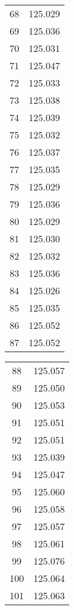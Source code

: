 \begin{multicols}{3}
\begin{table}[H]
\begin{tabular}{|c|c|}
            68 & 125.029 \\
            69 & 125.036 \\
            70 & 125.031 \\
            71 & 125.047 \\
            72 & 125.033 \\
            73 & 125.038 \\
            74 & 125.039 \\
            75 & 125.032 \\
            76 & 125.037 \\
            77 & 125.035 \\
            78 & 125.029 \\
            79 & 125.036 \\
            80 & 125.029 \\
            81 & 125.030 \\
            82 & 125.032 \\
            83 & 125.036 \\
            84 & 125.026 \\
            85 & 125.035 \\
            86 & 125.052 \\
            87 & 125.052 \\
            \hline
        \end{tabular}
    \end{table}
    \columnbreak
    \begin{table}[H]
        \centering
        \begin{tabular}{|c|c|}
            \hline
            88 & 125.057 \\
            89 & 125.050 \\
            90 & 125.053 \\
            91 & 125.051 \\
            92 & 125.051 \\
            93 & 125.039 \\
            94 & 125.047 \\
            95 & 125.060 \\
            96 & 125.058 \\
            97 & 125.057 \\
            98 & 125.061 \\
            99 & 125.076 \\
            100 & 125.064 \\
            101 & 125.063 \\

\end{tabular}
\end{table}
\end{multicols}
